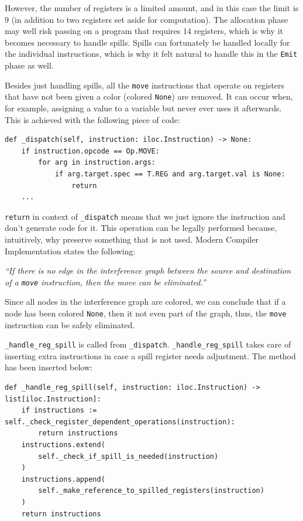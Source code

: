 However, the number of registers is a limited amount, and in this case the limit is $9$ (in addition to two registers set aside for computation). The allocation phase may well risk passing on a program that requires $14$ registers, which is why it becomes necessary to handle spills. Spills can fortunately be handled locally for the individual instructions, which is why it felt natural to handle this in the \texttt{Emit} phase as well.

Besides just handling spills, all the \texttt{move} instructions that operate on registers that have not been given a color (colored \texttt{None}) are removed. It can occur when, for example, assigning a value to a variable but never ever uses it afterwards. This is achieved with the following piece of code:

\begin{verbatim}
def _dispatch(self, instruction: iloc.Instruction) -> None:
    if instruction.opcode == Op.MOVE:
        for arg in instruction.args:
            if arg.target.spec == T.REG and arg.target.val is None:
                return
    ...
\end{verbatim}

\texttt{return} in context of \texttt{\_dispatch} means that we just ignore the instruction and don't generate code for it. This operation can be legally performed because, intuitively, why preserve something that is not used. Modern Compiler Implementation states the following:

\begin{displayquote}
    \textit{``If there is no edge in the interference graph between the source and destination of a \texttt{move} instruction, then the move can be eliminated.''}
\end{displayquote}
\hspace*{}

Since all nodes in the interference graph are colored, we can conclude that if a node has been colored \texttt{None}, then it not even part of the graph, thus, the \texttt{move} instruction can be safely eliminated.

\texttt{\_handle\_reg\_spill} is called from \texttt{\_dispatch}. \texttt{\_handle\_reg\_spill} takes care of inserting extra instructions in case a spill register needs adjustment. The method has been inserted below:

\begin{verbatim}
def _handle_reg_spill(self, instruction: iloc.Instruction) -> list[iloc.Instruction]:
    if instructions := self._check_register_dependent_operations(instruction):
        return instructions
    instructions.extend(
        self._check_if_spill_is_needed(instruction)
    )
    instructions.append(
        self._make_reference_to_spilled_registers(instruction)
    )
    return instructions
\end{verbatim}

